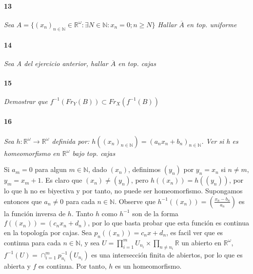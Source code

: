 \documentclass[12pt]{article}
\begin{document}
\paragraph{13}
\textit{Sea $A=\{(x_n)_{n\in\mathbb{N}}\in\mathbb{R}^\omega : \exists N\in\mathbb{N}: x_n =0 ; n \geq N \}$
Hallar $\overline{A}$ en top. uniforme}

\paragraph{14}
\textit{Sea A del ejercicio anterior, hallar $\overline{A}$ en top. cajas}

\paragraph{15}
\textit{Demostrar que $f^{-1}(Fr_Y(B))\subset Fr_X(f^{-1}(B))$}

\paragraph{16}
\textit{Sea $h:\mathbb{R}^\omega\rightarrow\mathbb{R}^\omega$ definida por: $h((x_n)_{n\in\mathbb{N}})=(a_n x_n +b_n)_{n\in\mathbb{N}}$. Ver si h es homeomorfismo en $\mathbb{R}^\omega$ bajo top. cajas}

Si $a_m=0$ para algun $m \in \mathbb{N}$, dado $(x_n)$, definimos $(y_n)$ por $y_n=x_n$ si $n \neq m$, $y_m=x_m+1$. Es claro que $(x_n) \neq (y_n)$, pero $h((x_n))=h((y_n))$, por lo que h no es biyectiva y por tanto, no puede ser homeomorfismo.
Supongamos entonces que $a_n \neq 0$ para cada $n \in \mathbb{N}$. Observe que $h^{-1}((x_n))=(\frac{x_n-b_n}{a_n})$ es la función inversa de $h$. Tanto $h$ como $h^{-1}$ son de la forma $f((x_n))=(c_n x_n+d_n)$, por lo que basta probar que esta función
es continua en la topología por cajas. Sea $p_n((x_n))=c_nx+d_n$, es facil ver que es continua para cada $n \in \mathbb{N}$, y sea $U=\prod_{i=1}^{m} U_{n_i} \times \prod_{n\neq n_i} \mathbb{R}$ un abierto en $\mathbb{R}^\omega$,  $f^{-1}(U)=\cap_{i=1}^{m} p^{-1}_{n_i}(U_{n_i})$ es una
intersección finita de abiertos, por lo que es abierta y $f$ es continua. Por tanto, $h$ es un homeomorfismo.
\end{document}
